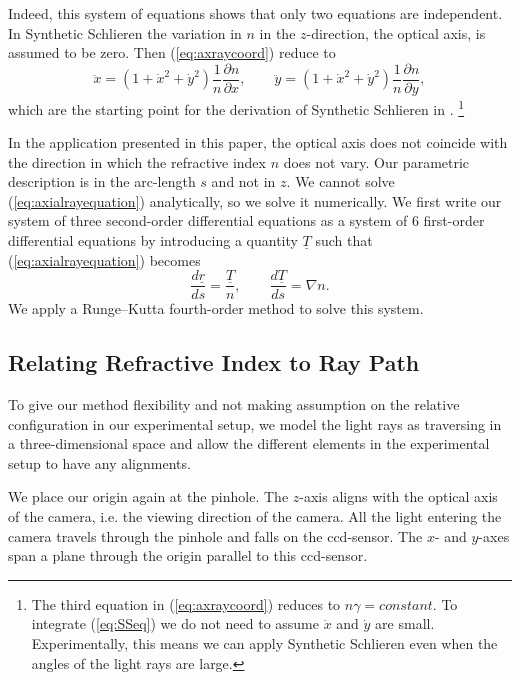 \documentclass{article}
\begin{document}
Indeed, this system of equations shows that only two equations are independent. In Synthetic Schlieren the variation in $n$ in the $z$-direction, the optical axis, is assumed to be zero. Then (\ref{eq:axraycoord}) reduce to
\begin{equation}
	\label{eq:SSeq}
		\ddot{x} = \left(1+\dot{x}^2+\dot{y}^2\right) \frac{1}{n} \frac{\partial n}{\partial x}, \qquad
		\ddot{y} = \left(1+\dot{x}^2+\dot{y}^2\right) \frac{1}{n} \frac{\partial n}{\partial y},
\end{equation}
which are the starting point for the derivation of Synthetic Schlieren in \cite{dalziel2000whole}.  \footnote{The third equation in (\ref{eq:axraycoord}) reduces to $n \gamma = constant$.  To integrate (\ref{eq:SSeq}) we do not need to assume $\dot{x}$ and $\dot{y}$ are small. Experimentally, this means we can apply Synthetic Schlieren even when the angles of the light rays are large. }

In the application presented in this paper, the optical axis does not coincide with the direction in which the refractive index $n$ does not vary. Our parametric description is in the arc-length $s$ and not in $z$.  We cannot solve (\ref{eq:axialrayequation}) analytically, so we solve it numerically. We first write our system of three second-order differential equations as a system of 6 first-order differential equations by introducing a quantity $\underline{T}$ \cite{southwell1982ray} such that (\ref{eq:axialrayequation}) becomes
\begin{equation}
	\label{eq:sys6foeq}
		\frac{d \underline{r}}{d s} = \frac{\underline{T}}{n}, \qquad
		\frac{d \underline{T}}{d s} = \nabla n.
\end{equation}
We apply a Runge–Kutta fourth-order method to solve this system. %

\subsection{Relating Refractive Index to Ray Path}
\label{subsec:RayPath}
To give our method flexibility and not making assumption on the relative configuration in our experimental setup, we model the light rays as traversing in a three-dimensional space and allow the different elements in the experimental setup to have any alignments.

We place our origin again at the pinhole. The $z$-axis aligns with the optical axis of the camera, i.e. the viewing direction of the camera. All the light entering the camera travels through the pinhole and falls on the ccd-sensor. The $x$- and $y$-axes span a plane through the origin parallel to this ccd-sensor. 
\end{document}

